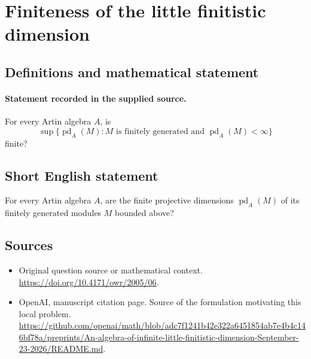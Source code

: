\documentclass[11pt]{article}
\begin{document}
\section*{Finiteness of the little finitistic dimension}\label{30007002}
\subsection{Definitions and mathematical statement}
\paragraph{Statement recorded in the supplied source.}
For every Artin algebra $A$, is
\[
\sup\{\operatorname{pd}_A(M): M\text{ is finitely generated and }\operatorname{pd}_A(M)<\infty\}
\]
finite?
\subsection{Short English statement}
For every Artin algebra $A$, are the finite projective dimensions $\operatorname{pd}_A(M)$ of its finitely generated modules $M$ bounded above?
\subsection{Sources}
\begin{itemize}
\item[S1] Original question source or mathematical context.
\url{https://doi.org/10.4171/owr/2005/06}.
\item[S2] OpenAI, manuscript citation page. Source of the formulation motivating this local problem.
\url{https://github.com/openai/math/blob/adc7f1241b42e322a6451854ab7e4b4c146bf78a/preprints/An-algebra-of-infinite-little-finitistic-dimension-September-23-2026/README.md}.
\end{itemize}
\end{document}

